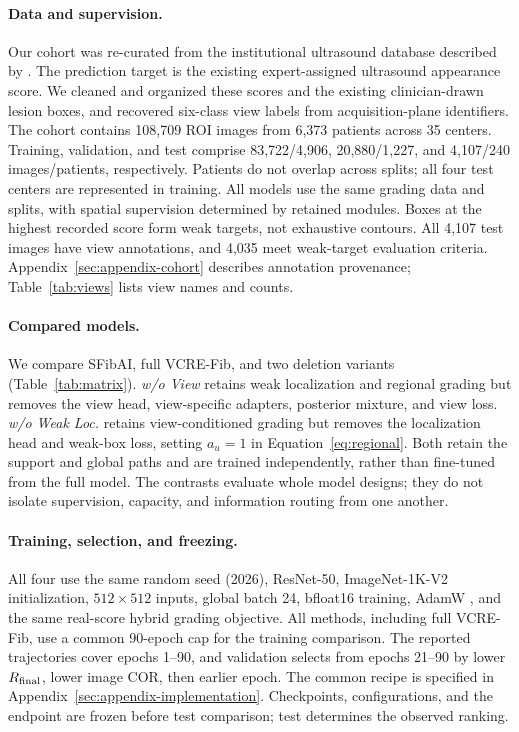 \paragraph{Data and supervision.}
Our cohort was re-curated from the institutional ultrasound database described by \citet{xu2026sfibai}. The prediction target is the existing expert-assigned ultrasound appearance score. We cleaned and organized these scores and the existing clinician-drawn lesion boxes, and recovered six-class view labels from acquisition-plane identifiers. The cohort contains 108,709 ROI images from 6,373 patients across 35 centers. Training, validation, and test comprise 83,722/4,906, 20,880/1,227, and 4,107/240 images/patients, respectively. Patients do not overlap across splits; all four test centers are represented in training. All models use the same grading data and splits, with spatial supervision determined by retained modules. Boxes at the highest recorded score form weak targets, not exhaustive contours. All 4,107 test images have view annotations, and 4,035 meet weak-target evaluation criteria. Appendix~\ref{sec:appendix-cohort} describes annotation provenance; Table~\ref{tab:views} lists view names and counts.

\paragraph{Compared models.}
We compare SFibAI, full VCRE-Fib, and two deletion variants (Table~\ref{tab:matrix}). \emph{w/o View} retains weak localization and regional grading but removes the view head, view-specific adapters, posterior mixture, and view loss. \emph{w/o Weak Loc.} retains view-conditioned grading but removes the localization head and weak-box loss, setting $a_u=1$ in Equation~\ref{eq:regional}. Both retain the support and global paths and are trained independently, rather than fine-tuned from the full model. The contrasts evaluate whole model designs; they do not isolate supervision, capacity, and information routing from one another.

\paragraph{Training, selection, and freezing.}
All four use the same random seed (2026), ResNet-50, ImageNet-1K-V2 initialization, $512\times512$ inputs, global batch 24, bfloat16 training, AdamW \citep{loshchilov2019adamw}, and the same real-score hybrid grading objective. All methods, including full VCRE-Fib, use a common 90-epoch cap for the training comparison. The reported trajectories cover epochs 1--90, and validation selects from epochs 21--90 by lower $R_{\mathrm{final}}$, lower image COR, then earlier epoch. The common recipe is specified in Appendix~\ref{sec:appendix-implementation}. Checkpoints, configurations, and the endpoint are frozen before test comparison; test determines the observed ranking.

